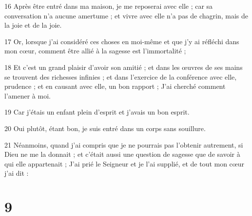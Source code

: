 \par 16 Après être entré dans ma maison, je me reposerai avec elle ; car sa conversation n'a aucune amertume ; et vivre avec elle n'a pas de chagrin, mais de la joie et de la joie.
\par 17 Or, lorsque j'ai considéré ces choses en moi-même et que j'y ai réfléchi dans mon cœur, comment être allié à la sagesse est l'immortalité ;
\par 18 Et c'est un grand plaisir d'avoir son amitié ; et dans les œuvres de ses mains se trouvent des richesses infinies ; et dans l'exercice de la conférence avec elle, prudence ; et en causant avec elle, un bon rapport ; J'ai cherché comment l'amener à moi.
\par 19 Car j'étais un enfant plein d'esprit et j'avais un bon esprit.
\par 20 Oui plutôt, étant bon, je suis entré dans un corps sans souillure.
\par 21 Néanmoins, quand j'ai compris que je ne pourrais pas l'obtenir autrement, si Dieu ne me la donnait ; et c'était aussi une question de sagesse que de savoir à qui elle appartenait ; J'ai prié le Seigneur et je l'ai supplié, et de tout mon cœur j'ai dit :

\chapter{9}

